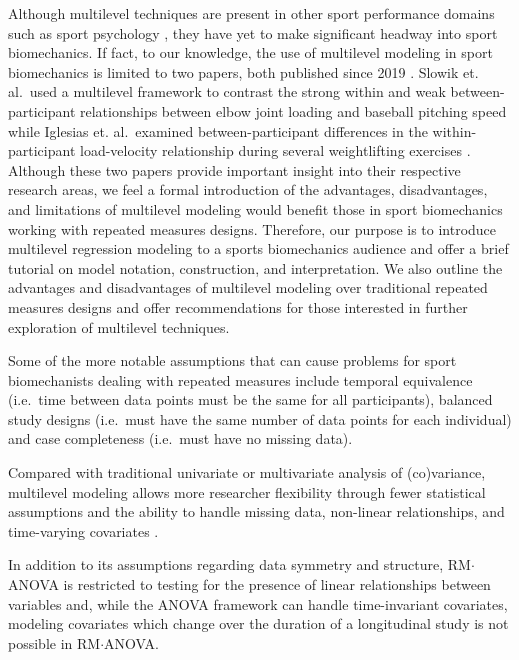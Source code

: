 \documentclass[
]{article}
\begin{document}
Although multilevel techniques are present in other sport performance domains such as sport psychology \cite{beauchamp2005,benson2016,cornelius2007}, they have yet to make significant headway into sport biomechanics. If fact, to our knowledge, the use of multilevel modeling in sport biomechanics is limited to two papers, both published since 2019 \cite{slowik2019, iglesias2021}. Slowik et. al.~used a multilevel framework to contrast the strong within and weak between-participant relationships between elbow joint loading and baseball pitching speed \cite{slowik2019} while Iglesias et. al.~examined between-participant differences in the within-participant load-velocity relationship during several weightlifting exercises \cite{iglesias2021}. Although these two papers provide important insight into their respective research areas, we feel a formal introduction of the advantages, disadvantages, and limitations of multilevel modeling would benefit those in sport biomechanics working with repeated measures designs. Therefore, our purpose is to introduce multilevel regression modeling to a sports biomechanics audience and offer a brief tutorial on model notation, construction, and interpretation. We also outline the advantages and disadvantages of multilevel modeling over traditional repeated measures designs and offer recommendations for those interested in further exploration of multilevel techniques.

Some of the more notable assumptions that can cause problems for sport biomechanists dealing with repeated measures include temporal equivalence (i.e.~time between data points must be the same for all participants), balanced study designs (i.e.~must have the same number of data points for each individual) and case completeness (i.e.~must have no missing data).

Compared with traditional univariate or multivariate analysis of (co)variance, multilevel modeling allows more researcher flexibility through fewer statistical assumptions and the ability to handle missing data, non-linear relationships, and time-varying covariates \cite{hox2017}.

In addition to its assumptions regarding data symmetry and structure, RM\(\cdot\)ANOVA is restricted to testing for the presence of linear relationships between variables and, while the ANOVA framework can handle time-invariant covariates, modeling covariates which change over the duration of a longitudinal study is not possible in RM\(\cdot\)ANOVA.

\newpage
\singlespacing
{}


\end{document}
